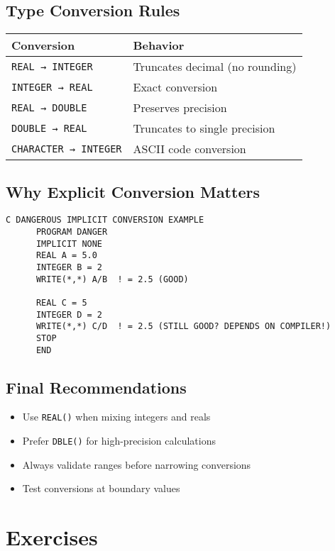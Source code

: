\documentclass{book}
\begin{document}
\subsection*{Type Conversion Rules}
\begin{center}
\begin{tabular}{|l|l|}
\hline
\textbf{Conversion} & \textbf{Behavior} \\ 
\hline
\texttt{REAL → INTEGER} & Truncates decimal (no rounding) \\
\texttt{INTEGER → REAL} & Exact conversion \\
\texttt{REAL → DOUBLE} & Preserves precision \\
\texttt{DOUBLE → REAL} & Truncates to single precision \\
\texttt{CHARACTER → INTEGER} & ASCII code conversion \\
\hline
\end{tabular}
\end{center}

\subsection*{Why Explicit Conversion Matters}
\begin{verbatim}
C DANGEROUS IMPLICIT CONVERSION EXAMPLE
      PROGRAM DANGER
      IMPLICIT NONE
      REAL A = 5.0
      INTEGER B = 2
      WRITE(*,*) A/B  ! = 2.5 (GOOD)
      
      REAL C = 5
      INTEGER D = 2
      WRITE(*,*) C/D  ! = 2.5 (STILL GOOD? DEPENDS ON COMPILER!)
      STOP
      END
\end{verbatim}

\subsection*{Final Recommendations}
\begin{itemize}
    \item Use \texttt{REAL()} when mixing integers and reals
    \item Prefer \texttt{DBLE()} for high-precision calculations
    \item Always validate ranges before narrowing conversions
    \item Test conversions at boundary values
\end{itemize}

\section{Exercises}
\end{document}
